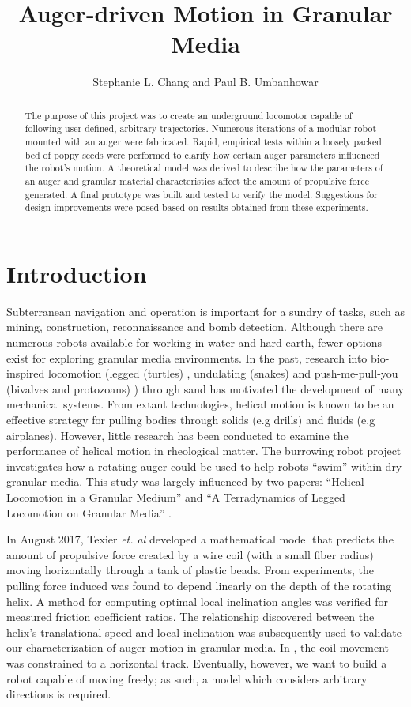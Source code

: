 \documentclass[letterpaper, 11 pt]{article}
\title{\Large \bf Auger-driven Motion in Granular Media}
\author{\centering Stephanie L. Chang and Paul B. Umbanhowar}
\begin{document}
\maketitle

\begin{abstract}
The purpose of this project was to create an underground locomotor capable of following user-defined, arbitrary trajectories. Numerous iterations of a modular robot mounted with an auger were fabricated. Rapid, empirical tests within a loosely packed bed of poppy seeds were performed to clarify how certain auger parameters influenced the robot's motion. A theoretical model was derived to describe how the parameters of an auger and granular material characteristics affect the amount of propulsive force generated. A final prototype was built and tested to verify the model. Suggestions for design improvements were posed based on results obtained from these experiments.    

\end{abstract}

\tableofcontents

\section{Introduction}
Subterranean navigation and operation is important for a sundry of tasks, such as mining, construction, reconnaissance and bomb detection. Although there are numerous robots available for working in water and hard earth, fewer options exist for exploring granular media environments. In the past, research into bio-inspired locomotion (legged (turtles) \cite{Mazouchova}, undulating (snakes) \cite{Marvi} and push-me-pull-you (bivalves and protozoans) \cite{Winter, Germann, Avron}) through sand has motivated the development of many mechanical systems. From extant technologies, helical motion is known to be an effective strategy for pulling bodies through solids (e.g drills) and fluids (e.g airplanes). However, little research has been conducted to examine the performance of helical motion in rheological matter. The burrowing robot project investigates how a rotating auger could be used to help robots ``swim'' within dry granular media. This study was largely influenced by two papers: ``Helical Locomotion in a Granular Medium'' and ``A Terradynamics of Legged Locomotion on Granular Media'' \cite{Melo, Li}.

In August 2017, Texier \textit{et. al} developed a mathematical model that predicts the amount of propulsive force created by a wire coil (with a small fiber radius) moving horizontally through a tank of plastic beads. From experiments, the pulling force induced was found to depend linearly on the depth of the rotating helix. A method for computing optimal local inclination angles was verified for measured friction coefficient ratios. The relationship discovered between the helix's translational speed and local inclination was subsequently used to validate our characterization of auger motion in granular media. In \cite{Melo}, the coil movement was constrained to a horizontal track. Eventually, however, we want to build a robot capable of moving freely; as such, a model which considers arbitrary directions is required.     
\end{document}
